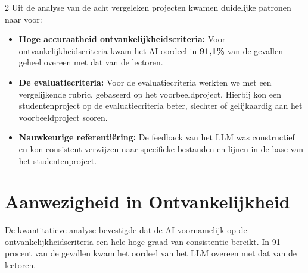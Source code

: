 \documentclass[a0,portrait]{hogent-poster}
\begin{document}
\begin{multicols}{2}
Uit de analyse van de acht vergeleken projecten kwamen duidelijke patronen naar voor:

\begin{itemize}
    \item \textbf{Hoge accuraatheid ontvankelijkheidscriteria:} Voor ontvankelijkheidscriteria kwam het AI-oordeel in \textbf{91,1\%} van de gevallen geheel overeen met dat van de lectoren.
    \item \textbf{De evaluatiecriteria:} Voor de evaluatiecriteria werkten we met een vergelijkende rubric, gebaseerd op het voorbeeldproject. Hierbij kon een studentenproject op de evaluatiecriteria beter, slechter of gelijkaardig aan het voorbeeldproject scoren.
    \item \textbf{Nauwkeurige referentiëring:} De feedback van het LLM was constructief en kon consistent verwijzen naar specifieke bestanden en lijnen in de base van het studentenproject.
\end{itemize}

\section{Aanwezigheid in Ontvankelijkheid}

De kwantitatieve analyse bevestigde dat de AI voornamelijk op de ontvankelijkheidscriteria een hele hoge graad van consistentie bereikt. In 91 procent van de gevallen kwam het oordeel van het LLM overeen met dat van de lectoren.

\begin{center}
    \captionsetup{type=figure}
\end{center}


\end{multicols}
\end{document}
